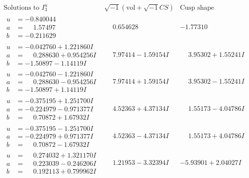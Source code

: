 \documentclass[1p]{elsarticle_modified}
\theoremstyle{definition}
\newcommand{\I}{\sqrt{-1}}
\begin{document}
$$\begin{array}{c|c|c}  
\text{Solutions to }I^u_{3}& \I (\text{vol} + \sqrt{-1}CS) & \text{Cusp shape}\\
 \hline 
\begin{aligned}
u &= -0.840044\phantom{ +0.000000I} \\
a &= \phantom{-}1.57497\phantom{ +0.000000I} \\
b &= -0.211629\phantom{ +0.000000I}\end{aligned}
 & \phantom{-}0.654628\phantom{ +0.000000I} & -1.77310\phantom{ +0.000000I} \\ \hline\begin{aligned}
u &= -0.042760 + 1.221860 I \\
a &= \phantom{-}0.288630 + 0.954256 I \\
b &= -1.50897 - 1.14119 I\end{aligned}
 & \phantom{-}7.97414 - 1.59154 I & \phantom{-}3.95302 + 1.55241 I \\ \hline\begin{aligned}
u &= -0.042760 - 1.221860 I \\
a &= \phantom{-}0.288630 - 0.954256 I \\
b &= -1.50897 + 1.14119 I\end{aligned}
 & \phantom{-}7.97414 + 1.59154 I & \phantom{-}3.95302 - 1.55241 I \\ \hline\begin{aligned}
u &= -0.375195 + 1.251700 I \\
a &= -0.224979 - 0.971377 I \\
b &= \phantom{-}0.70872 + 1.67932 I\end{aligned}
 & \phantom{-}4.52363 + 4.37134 I & \phantom{-}1.55173 - 4.04786 I \\ \hline\begin{aligned}
u &= -0.375195 - 1.251700 I \\
a &= -0.224979 + 0.971377 I \\
b &= \phantom{-}0.70872 - 1.67932 I\end{aligned}
 & \phantom{-}4.52363 - 4.37134 I & \phantom{-}1.55173 + 4.04786 I \\ \hline\begin{aligned}
u &= \phantom{-}0.274032 + 1.321170 I \\
a &= \phantom{-}0.223039 - 0.246206 I \\
b &= \phantom{-}0.192113 + 0.799962 I\end{aligned}
 & \phantom{-}1.21953 - 3.32394 I & -5.93901 + 2.04027 I \\ \hline\begin{aligned}

\end{aligned}
\end{array}$$
\end{document}
